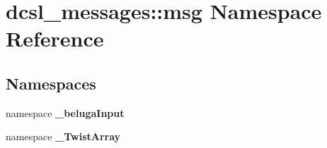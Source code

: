 \section{dcsl\-\_\-messages\-:\-:msg \-Namespace \-Reference}
\label{namespacedcsl__messages_1_1msg}
\subsection*{\-Namespaces}
\begin{DoxyCompactItemize}
\item 
namespace {\bf \-\_\-beluga\-Input}
\item 
namespace {\bf \-\_\-\-Twist\-Array}
\end{DoxyCompactItemize}
